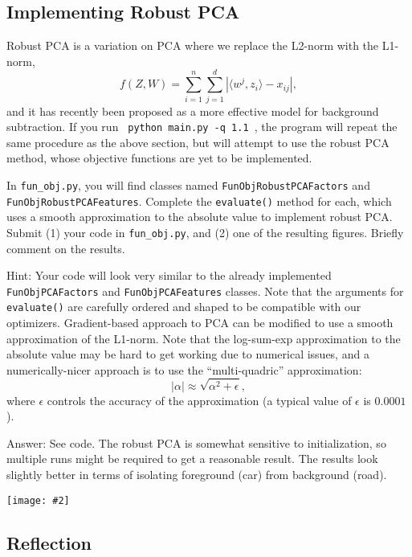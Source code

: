 \documentclass{article}
\def\ans#1{\par\gre{Answer: #1}}
\def\answer#1{\ans{#1}}
\def\blu#1{{\color{blu}#1}}
\def\gre#1{{\color{gre}#1}}
\newcommand{\centerfig}[2]{\begin{center}\texttt{[image: \#2]}\end{center}}
\begin{document}
\subsection{Implementing Robust PCA}

Robust PCA is a variation on PCA where we replace the L2-norm with the L1-norm,
\[
f(Z,W) = \sum_{i=1}^n\sum_{j=1}^d |\langle w^j, z_i\rangle - x_{ij}|,
\]
and it has recently been proposed as a more effective model for background subtraction. If you run \verb| python main.py -q 1.1 |, the program will repeat the same procedure as the above section, but will attempt to use the robust PCA method, whose objective functions are yet to be implemented.

In \texttt{fun\_obj.py}, you will find classes named \texttt{FunObjRobustPCAFactors} and \texttt{FunObjRobustPCAFeatures}. \blu{Complete the \texttt{evaluate()} method for each, which uses a smooth approximation to the absolute value to implement robust PCA. Submit (1) your code in \texttt{fun\_obj.py}, and (2) one of the resulting figures. Briefly comment on the results.}

Hint: Your code will look very similar to the already implemented \texttt{FunObjPCAFactors} and \texttt{FunObjPCAFeatures} classes. Note that the arguments for \texttt{evaluate()} are carefully ordered and shaped to be compatible with our optimizers. Gradient-based approach to PCA can be modified to use a smooth approximation of the L1-norm. Note that the log-sum-exp approximation to the absolute value may be hard to get working due to numerical issues, and a numerically-nicer approach is to use the ``multi-quadric'' approximation:
\[
|\alpha| \approx \sqrt{\alpha^2 + \epsilon},
\]
where $\epsilon$ controls the accuracy of the approximation (a typical value of $\epsilon$ is $0.0001$).



\answer{
	See code. The robust PCA is somewhat sensitive to initialization, so multiple runs might be required to get a reasonable result. The results look slightly better in terms of isolating foreground (car) from background (road).
	\centerfig{.7}{../figs/highway_006.jpg}
}

\subsection{Reflection}
\end{document}
